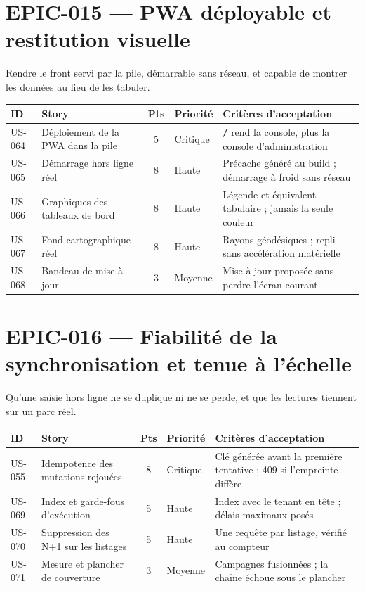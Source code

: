 \section{EPIC-015 --- PWA déployable et restitution visuelle}

Rendre le front servi par la pile, démarrable sans réseau, et capable de montrer
les données au lieu de les tabuler.

\begin{center}
\begin{tabular}{lp{6.6cm}cl p{4.6cm}}
\toprule
\textbf{ID} & \textbf{Story} & \textbf{Pts} & \textbf{Priorité} & \textbf{Critères d'acceptation} \\
\midrule
US-064 & Déploiement de la PWA dans la pile & 5 & Critique & \texttt{/} rend la console, plus la console d'administration \\
US-065 & Démarrage hors ligne réel          & 8 & Haute    & Précache généré au build ; démarrage à froid sans réseau \\
US-066 & Graphiques des tableaux de bord    & 8 & Haute    & Légende et équivalent tabulaire ; jamais la seule couleur \\
US-067 & Fond cartographique réel           & 8 & Haute    & Rayons géodésiques ; repli sans accélération matérielle \\
US-068 & Bandeau de mise à jour             & 3 & Moyenne  & Mise à jour proposée sans perdre l'écran courant \\
\bottomrule
\end{tabular}
\end{center}

\section{EPIC-016 --- Fiabilité de la synchronisation et tenue à l'échelle}

Qu'une saisie hors ligne ne se duplique ni ne se perde, et que les lectures
tiennent sur un parc réel.

\begin{center}
\begin{tabular}{lp{6.6cm}cl p{4.6cm}}
\toprule
\textbf{ID} & \textbf{Story} & \textbf{Pts} & \textbf{Priorité} & \textbf{Critères d'acceptation} \\
\midrule
US-055 & Idempotence des mutations rejouées    & 8 & Critique & Clé générée avant la première tentative ; 409 si l'empreinte diffère \\
US-069 & Index et garde-fous d'exécution       & 5 & Haute    & Index avec le tenant en tête ; délais maximaux posés \\
US-070 & Suppression des N+1 sur les listages  & 5 & Haute    & Une requête par listage, vérifié au compteur \\
US-071 & Mesure et plancher de couverture      & 3 & Moyenne  & Campagnes fusionnées ; la chaîne échoue sous le plancher \\
\bottomrule
\end{tabular}
\end{center}

